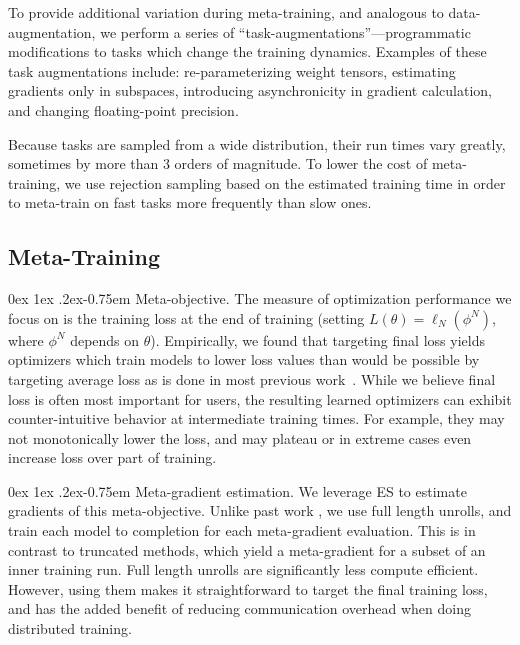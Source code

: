\documentclass[11pt]{article}
\makeatletter
\renewcommand{\paragraph}{%
  \@startsection{paragraph}{4}%
  {\z@}{0ex \@plus 1ex \@minus .2ex}{-0.75em}%
  {\normalfont\normalsize\bfseries}%
}
\makeatother
\begin{document}
To provide additional variation during meta-training, and analogous to data-augmentation, we perform a series of ``task-augmentations''---programmatic modifications to tasks which change the training dynamics.
Examples of these task augmentations include: re-parameterizing weight tensors, estimating gradients only in subspaces, introducing asynchronicity in gradient calculation, and changing floating-point precision.

Because tasks are sampled from a wide distribution, their run times vary greatly, sometimes by more than 3 orders of magnitude. To lower the cost of meta-training, we use rejection sampling based on the estimated training time in order to meta-train on fast tasks more frequently than slow ones. 

\subsection{Meta-Training}
\paragraph{Meta-objective.}
The measure of optimization performance we focus on is the training loss at the end of training (setting $L(\theta) = \ell_N(\phi^N)$, where $\phi^N$ depends on $\theta$).
Empirically, we found that targeting final loss yields optimizers which train models to lower loss values than would be possible by targeting average loss as is done in most previous work~\citep{metz2020tasks}.
While we believe final loss is often most important for users, the resulting learned optimizers can exhibit counter-intuitive behavior at intermediate training times.
For example, they may not monotonically lower the loss, and may plateau or in extreme cases even increase loss over part of training. 

\paragraph{Meta-gradient estimation.}
We leverage ES to estimate gradients of this meta-objective.
Unlike past work \citep{metz2022practical,metz2019understanding}, we use full length unrolls, and train each model to completion for each meta-gradient evaluation. This is in contrast to truncated methods, which yield a meta-gradient for a subset of an inner training run. 
Full length unrolls are significantly less compute efficient. 
However, using them makes it straightforward to target the final training loss, and has the added benefit of reducing communication overhead when doing distributed training.
\end{document}
